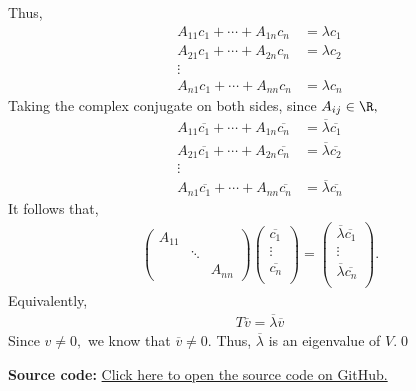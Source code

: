 \documentclass{amsart}
\newcommand{\pagenum}{140}
\newcommand{\probnum}{16}
\begin{document}
Thus,
\begin{align*}
    A_{11}c_1+\cdots+A_{1n}c_n&=\lambda c_1\\
    A_{21}c_1+\cdots+A_{2n}c_n&=\lambda c_2\\
    \vdots\\
    A_{n1}c_1+\cdots+A_{nn}c_n&=\lambda c_n
\end{align*}
Taking the complex conjugate on both sides, since $A_{ij}\in\R,$
\begin{align*}
    A_{11}\overline{c_1}+\cdots+A_{1n}\overline{c_n}&=\overline{\lambda}\overline{c_1}\\
    A_{21}\overline{c_1}+\cdots+A_{2n}\overline{c_n}&=\overline{\lambda}\overline{c_2}\\
    \vdots\\
    A_{n1}\overline{c_1}+\cdots+A_{nn}\overline{c_n}&=\overline{\lambda}\overline{c_n}
\end{align*}
It follows that,
\begin{align*}
    \begin{pmatrix}
        A_{11} & & \\
               & \ddots & \\
               & & A_{nn}
    \end{pmatrix}\begin{pmatrix}
        \overline{c_1}\\
        \vdots\\
        \overline{c_n}\\
    \end{pmatrix}
    =\begin{pmatrix}
        \overline{\lambda}\overline{c_1}\\
        \vdots\\
        \overline{\lambda}\overline{c_n}\\
    \end{pmatrix}.
\end{align*}
Equivalently,
\begin{align*}
    T\overline v=\overline\lambda\overline v
\end{align*}
Since $v\ne0,$ we know that $\overline v\ne 0.$ Thus, $\overline\lambda$
is an eigenvalue of $V$.\qed

\vspace{0.5in}

\textbf{Source code:} \href{https://github.com/thomasbreydo/linalg/blob/main/\pagenum_\probnum_Thomas_Breydo.tex}
{Click here to open the source code on GitHub.}
\end{document}
